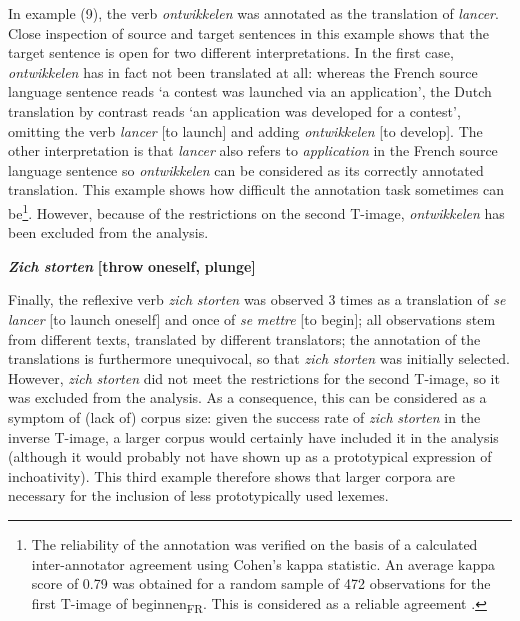 In example (9), the verb \textit{ontwikkelen} was annotated as the translation of \textit{lancer}. Close inspection of source and target sentences in this example shows that the target sentence is open for two different interpretations. In the first case, \textit{ontwikkelen} has in fact not been translated at all: whereas the French source language sentence reads ‘a contest was launched via an application’, the Dutch translation by contrast reads ‘an application was developed for a contest’, omitting the verb \textit{lancer} [to launch] and adding \textit{ontwikkelen} [to develop]. The other interpretation is that \textit{lancer} also refers to \textit{application} in the French source language sentence so \textit{ontwikkelen} can be considered as its correctly annotated translation. This example shows how difficult the annotation task sometimes can be\footnote{The reliability of the annotation was verified on the basis of a calculated inter-annotator agreement using Cohen’s kappa statistic. An average kappa score of 0.79 was obtained for a random sample of 472 observations for the first T-image of beginnen\textsubscript{FR}. This is considered as a reliable agreement  \citep{carletta_assessing_1996}.}. However, because of the restrictions on the second T-image, \textit{ontwikkelen} has been excluded from the analysis.

\textit{\textbf{Zich} \textbf{storten} }\textbf{[throw} \textbf{oneself,} \textbf{plunge]}

Finally, the reflexive verb \textit{zich} \textit{storten} was observed 3 times as a translation of \textit{se} \textit{lancer} [to launch oneself] and once of \textit{se} \textit{mettre} [to begin]; all observations stem from different texts, translated by different translators; the annotation of the translations is furthermore unequivocal, so that \textit{zich} \textit{storten} was initially selected. However, \textit{zich} \textit{storten} did not meet the restrictions for the second T-image, so it was excluded from the analysis. As a consequence, this can be considered as a symptom of (lack of) corpus size: given the success rate of \textit{zich} \textit{storten} in the inverse T-image, a larger corpus would certainly have included it in the analysis (although it would probably not have shown up as a prototypical expression of inchoativity). This third example therefore shows that larger corpora are necessary for the inclusion of less prototypically used lexemes.

